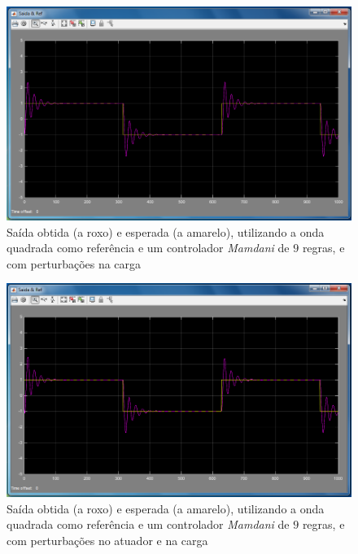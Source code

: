 \documentclass{article}
\begin{document}
\begin{figure}[h]
  \centering
      \includegraphics[scale=0.3]{Images/Mamdani_9_square_charge.png}
  \caption{Saída obtida (a roxo) e esperada (a amarelo), utilizando a onda quadrada como referência e um controlador \emph{Mamdani} de $9$ regras, e com perturbações na carga}
\end{figure}


\begin{figure}[h]
  \centering
      \includegraphics[scale=0.3]{Images/Mamdani_9_square_actuator_charge.png}
  \caption{Saída obtida (a roxo) e esperada (a amarelo), utilizando a onda quadrada como referência e um controlador \emph{Mamdani} de $9$ regras, e com perturbações no atuador e na carga}
\end{figure}

\end{document}
